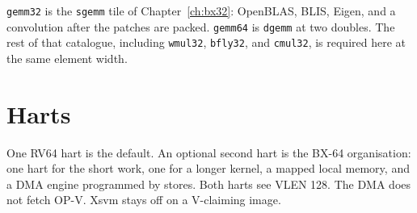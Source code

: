 \texttt{gemm32} is the \texttt{sgemm} tile of Chapter~\ref{ch:bx32}: OpenBLAS, BLIS, Eigen, and a convolution after the patches are packed. \texttt{gemm64} is \texttt{dgemm} at two doubles. The rest of that catalogue, including \texttt{wmul32}, \texttt{bfly32}, and \texttt{cmul32}, is required here at the same element width.




\section{Harts}

One RV64 hart is the default. An optional second hart is the BX-64 organisation: one hart for the short work, one for a longer kernel, a mapped local memory, and a DMA engine programmed by stores. Both harts see VLEN 128. The DMA does not fetch OP-V. Xsvm stays off on a V-claiming image.
